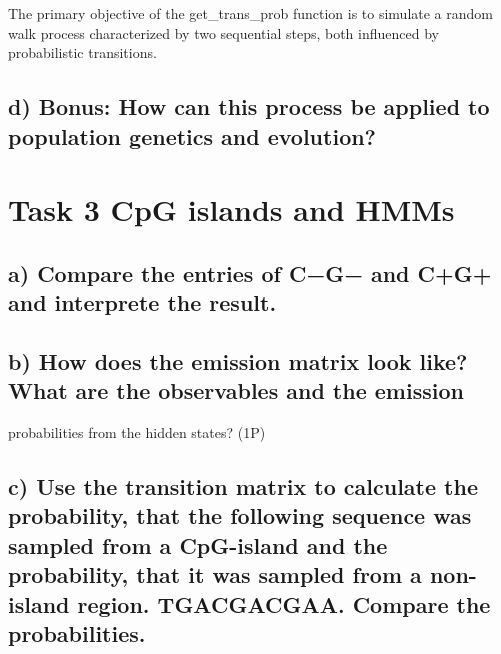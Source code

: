 \documentclass[
]{article}
\begin{document}
The primary objective of the get\_trans\_prob function is to simulate a
random walk process characterized by two sequential steps, both
influenced by probabilistic transitions.

\hypertarget{d-bonus-how-can-this-process-be-applied-to-population-genetics-and-evolution}{%
\subsection{d) Bonus: How can this process be applied to population
genetics and
evolution?}\label{d-bonus-how-can-this-process-be-applied-to-population-genetics-and-evolution}}

\hypertarget{task-3-cpg-islands-and-hmms}{%
\section{Task 3 CpG islands and
HMMs}\label{task-3-cpg-islands-and-hmms}}

\hypertarget{a-compare-the-entries-of-cg-and-cg-and-interprete-the-result.}{%
\subsection{a) Compare the entries of C−G− and C+G+ and interprete the
result.}\label{a-compare-the-entries-of-cg-and-cg-and-interprete-the-result.}}

\hypertarget{b-how-does-the-emission-matrix-look-like-what-are-the-observables-and-the-emission}{%
\subsection{b) How does the emission matrix look like? What are the
observables and the
emission}\label{b-how-does-the-emission-matrix-look-like-what-are-the-observables-and-the-emission}}

probabilities from the hidden states? (1P)

\hypertarget{c-use-the-transition-matrix-to-calculate-the-probability-that-the-following-sequence-was-sampled-from-a-cpg-island-and-the-probability-that-it-was-sampled-from-a-non-island-region.-tgacgacgaa.-compare-the-probabilities.}{%
\subsection{c) Use the transition matrix to calculate the probability,
that the following sequence was sampled from a CpG-island and the
probability, that it was sampled from a non-island region. TGACGACGAA.
Compare the
probabilities.}\label{c-use-the-transition-matrix-to-calculate-the-probability-that-the-following-sequence-was-sampled-from-a-cpg-island-and-the-probability-that-it-was-sampled-from-a-non-island-region.-tgacgacgaa.-compare-the-probabilities.}}
\end{document}
